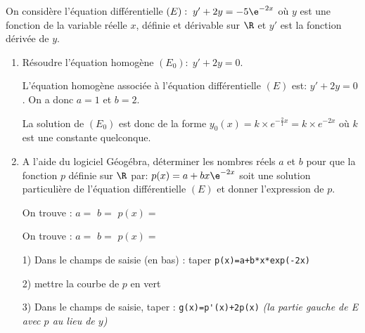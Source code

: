 \def\level{BTS}  %
\def\course{CIEL 2}
\def\chaptername{Equations différentielles} %
\def\docpart{Résolution ED avec Geogebra} %
\def\docname{C213}        %

\pagestyle{cours_FP}
\makeheaderBTS{} %

On considère l'équation différentielle $(E):\; y'+2y=-5\e^{-2x}$ où $y$ est une fonction de la variable réelle $x$, définie et dérivable sur $\R$ et $y'$ est la fonction dérivée de $y$.

\begin{enumerate}
	\item Résoudre l'équation homogène $(E_0):\; y'+2y=0$.
	
	\begin{blocvisiblex}[height=2]
    {\quad}
L'équation homogène associée à l'équation différentielle $(E)$ est: $y'+2y=0$. On a donc $a=1$ et $b=2$.
\par
La solution de $(E_0)$ est donc de la forme $y_0(x)=k \times e^{-\frac{2}{1}x}=k \times e^{-2x}$ où $k$ est une constante quelconque.
\end{blocvisiblex}

\medskip

	\item A l'aide du logiciel Géogébra, déterminer les nombres réels $a$ et $b$ pour que la fonction $p$ définie sur $\R$ par: $p(x)=a+bx\e^{-2x}$ soit une solution particulière de l'équation différentielle $(E)$ et donner l'expression de $p$.

\begin{blocvisiblex}[height=1]
    {
			On trouve : $a=$\makebox[0.1\linewidth]{\dotfill} \hfill $b=$\makebox[0.1\linewidth]{\dotfill} \hfill $p(x)=$\makebox[0.3\linewidth]{\dotfill}

	}
	On trouve : $a=$\makebox[0.1\linewidth]{\dotfill} \hfill $b=$\makebox[0.1\linewidth]{\dotfill} \hfill $p(x)=$\makebox[0.3\linewidth]{\dotfill}
\end{blocvisiblex}

	
	\begin{methode}{}
	1) Dans le champs de saisie (en bas) : taper \verb|p(x)=a+b*x*exp(-2x)|
	
	2) mettre la courbe de $p$ en vert
	
	3) Dans le champs de saisie, taper : \verb|g(x)=p'(x)+2p(x)| {\it \footnotesize (la partie gauche de E avec $p$ au lieu de $y$)}
	

\end{methode}
\end{enumerate}
